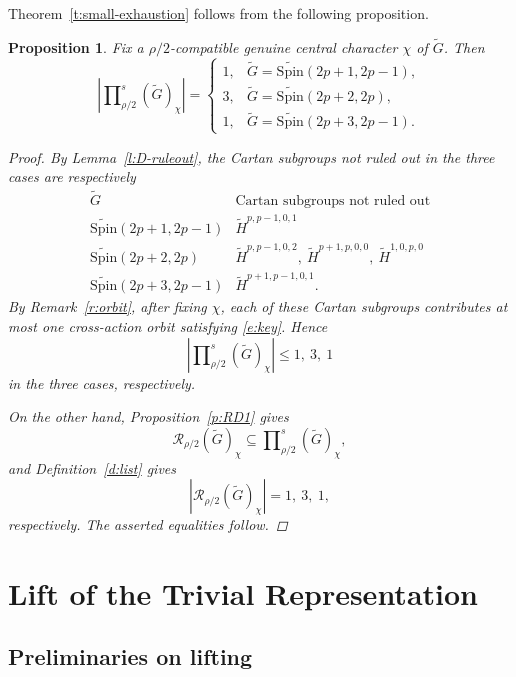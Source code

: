 \documentclass{amsart}
\newcommand{\Spin}{{\mathrm{Spin}}}
\newtheorem{prop}[thm]{Proposition}
\theoremstyle{definition}
\begin{document}
Theorem~\ref{t:small-exhaustion} follows from the following
proposition.

\begin{prop}\label{p:RD2}
Fix a \(\rho/2\)-compatible genuine central character \(\chi\) of
\(\widetilde G\). Then
\[
\left|
\prod\nolimits_{\rho/2}^{s}(\widetilde G)_\chi
\right|
=
\begin{cases}
1,
&
\widetilde G=\widetilde{\Spin}(2p+1,2p-1),
\\[1mm]
3,
&
\widetilde G=\widetilde{\Spin}(2p+2,2p),
\\[1mm]
1,
&
\widetilde G=\widetilde{\Spin}(2p+3,2p-1).
\end{cases}
\]

\begin{proof}
By Lemma~\ref{l:D-ruleout}, the Cartan subgroups not ruled out in
the three cases are respectively
\[
\begin{array}{c|c}
\widetilde G
&
\text{Cartan subgroups not ruled out}
\\
\hline
\widetilde{\Spin}(2p+1,2p-1)
&
\widetilde H^{p,p-1,0,1}
\\[1mm]
\widetilde{\Spin}(2p+2,2p)
&
\widetilde H^{p,p-1,0,2},\
\widetilde H^{p+1,p,0,0},\
\widetilde H^{1,0,p,0}
\\[1mm]
\widetilde{\Spin}(2p+3,2p-1)
&
\widetilde H^{p+1,p-1,0,1}.
\end{array}
\]
By Remark~\ref{r:orbit}, after fixing \(\chi\), each of these Cartan
subgroups contributes at most one cross-action orbit satisfying
\eqref{e:key}. Hence
\[
\left|
\prod\nolimits_{\rho/2}^{s}(\widetilde G)_\chi
\right|
\leq
1,\ 3,\ 1
\]
in the three cases, respectively.

On the other hand, Proposition~\ref{p:RD1} gives
\[
\mathcal R_{\rho/2}(\widetilde G)_\chi
\subseteq
\prod\nolimits_{\rho/2}^{s}(\widetilde G)_\chi,
\]
and Definition~\ref{d:list} gives
\[
\left|
\mathcal R_{\rho/2}(\widetilde G)_\chi
\right|
=
1,\ 3,\ 1,
\]
respectively. The asserted equalities follow.
\end{proof}
\end{prop}



\section{Lift of the Trivial Representation}

\subsection{Preliminaries on lifting}
\end{document}
